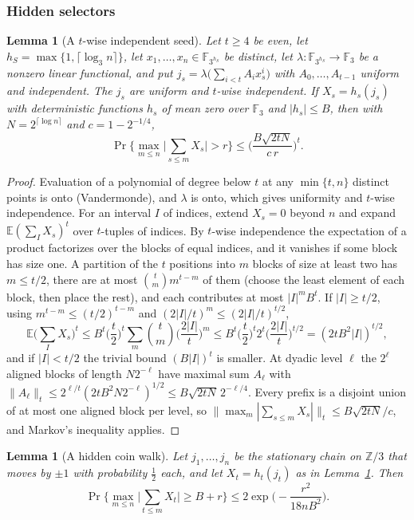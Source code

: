 \documentclass[11pt,a4paper]{article}
\theoremstyle{plain}
\newtheorem{lemma}[theorem]{Lemma}
\theoremstyle{definition}
\theoremstyle{remark}
\begin{document}
\subsubsection{Hidden selectors}

\begin{lemma}[A $t$-wise independent seed]\label{lem:seed}
Let $t\ge4$ be even, let $h_S=\max\{1,\lceil\log_3n\rceil\}$, let $x_1,\dots,x_n\in\mathbb F_{3^{h_S}}$ be distinct, let
$\lambda:\mathbb F_{3^{h_S}}\to\mathbb F_3$ be a nonzero linear functional, and put $j_s=\lambda\big(\sum_{i<t}A_ix_s^i\big)$ with
$A_0,\dots,A_{t-1}$ uniform and independent. The $j_s$ are uniform and $t$-wise independent. If $X_s=h_s(j_s)$ with deterministic
functions $h_s$ of mean zero over $\mathbb F_3$ and $|h_s|\le B$, then with $N=2^{\lceil\log n\rceil}$ and $c=1-2^{-1/4}$,
\[
\Pr\Big\{\max_{m\le n}\Big|\sum_{s\le m}X_s\Big|>r\Big\}\le\Big(\frac{B\sqrt{2tN}}{c\,r}\Big)^t .
\]
\end{lemma}

\begin{proof}
Evaluation of a polynomial of degree below $t$ at any $\min\{t,n\}$ distinct points is onto (Vandermonde), and $\lambda$ is onto,
which gives uniformity and $t$-wise independence. For an interval $I$ of indices, extend $X_s=0$ beyond $n$ and expand
$\mathbb E(\sum_IX_s)^t$ over $t$-tuples of indices. By $t$-wise independence the expectation of a product factorizes over the blocks
of equal indices, and it vanishes if some block has size one. A partition of the $t$ positions into $m$ blocks of size at least two has
$m\le t/2$, there are at most $\binom tm m^{t-m}$ of them (choose the least element of each block, then place the rest), and each
contributes at most $|I|^mB^t$. If $|I|\ge t/2$, using $m^{t-m}\le(t/2)^{t-m}$ and $(2|I|/t)^m\le(2|I|/t)^{t/2}$,
\[
\mathbb E\Big(\sum_IX_s\Big)^t\le B^t\Big(\frac t2\Big)^t\sum_m\binom tm\Big(\frac{2|I|}t\Big)^m\le B^t\Big(\frac t2\Big)^t2^t\Big(\frac{2|I|}t\Big)^{t/2}
=(2tB^2|I|)^{t/2},
\]
and if $|I|<t/2$ the trivial bound $(B|I|)^t$ is smaller. At dyadic level $\ell$ the $2^\ell$ aligned blocks of length $N2^{-\ell}$
have maximal sum $A_\ell$ with $\|A_\ell\|_t\le2^{\ell/t}(2tB^2N2^{-\ell})^{1/2}\le B\sqrt{2tN}\,2^{-\ell/4}$. Every prefix is a disjoint
union of at most one aligned block per level, so $\|\max_m|\sum_{s\le m}X_s|\|_t\le B\sqrt{2tN}/c$, and Markov's inequality applies.
\end{proof}

\begin{lemma}[A hidden coin walk]\label{lem:coinwalk}
Let $j_1,\dots,j_n$ be the stationary chain on $\mathbb Z/3$ that moves by $\pm1$ with probability $\frac12$ each, and let
$X_t=h_t(j_t)$ as in Lemma~\ref{lem:seed}. Then
\[
\Pr\Big\{\max_{m\le n}\Big|\sum_{t\le m}X_t\Big|\ge B+r\Big\}\le2\exp\Big(-\frac{r^2}{18nB^2}\Big).
\]
\end{lemma}
\end{document}
